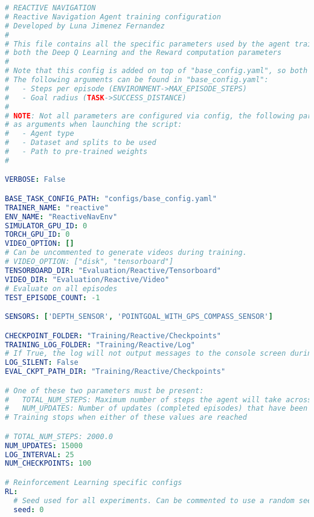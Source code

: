\begin{lstlisting}[language=yaml]
# REACTIVE NAVIGATION
# Reactive Navigation Agent training configuration
# Developed by Luna Jimenez Fernandez
#
# This file contains all the specific parameters used by the agent training, including
# both the Deep Q Learning and the Reward computation parameters
#
# Note that this config is added on top of "base_config.yaml", so both files need to be configured
# The following arguments can be found in "base_config.yaml":
#	- Steps per episode (ENVIRONMENT->MAX_EPISODE_STEPS)
#	- Goal radius (TASK->SUCCESS_DISTANCE)
#
# NOTE: Not all parameters are configured via config, the following parameters can be specified
# as arguments when launching the script:
#	- Agent type
#	- Dataset and splits to be used
#	- Path to pre-trained weights
#

VERBOSE: False

BASE_TASK_CONFIG_PATH: "configs/base_config.yaml"
TRAINER_NAME: "reactive"
ENV_NAME: "ReactiveNavEnv"
SIMULATOR_GPU_ID: 0
TORCH_GPU_ID: 0
VIDEO_OPTION: []
# Can be uncommented to generate videos during training.
# VIDEO_OPTION: ["disk", "tensorboard"]
TENSORBOARD_DIR: "Evaluation/Reactive/Tensorboard"
VIDEO_DIR: "Evaluation/Reactive/Video"
# Evaluate on all episodes
TEST_EPISODE_COUNT: -1

SENSORS: ['DEPTH_SENSOR', 'POINTGOAL_WITH_GPS_COMPASS_SENSOR']

CHECKPOINT_FOLDER: "Training/Reactive/Checkpoints"
TRAINING_LOG_FOLDER: "Training/Reactive/Log"
# If True, the log will not output messages to the console screen during training
LOG_SILENT: False
EVAL_CKPT_PATH_DIR: "Training/Reactive/Checkpoints"

# One of these two parameters must be present:
#	TOTAL_NUM_STEPS: Maximum number of steps the agent will take across all epochs
#	NUM_UPDATES: Number of updates (completed episodes) that have been performed
# Training stops when either of these values are reached

# TOTAL_NUM_STEPS: 2000.0
NUM_UPDATES: 15000
LOG_INTERVAL: 25
NUM_CHECKPOINTS: 100

# Reinforcement Learning specific configs
RL:
  # Seed used for all experiments. Can be commented to use a random seed
  seed: 0


\end{lstlisting}
